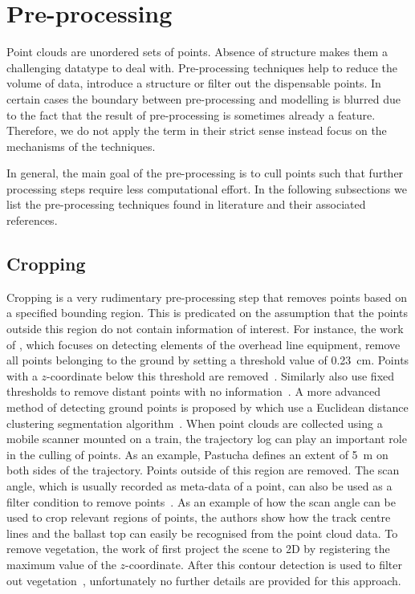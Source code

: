 \section{Pre-processing}\label{sec:stoa:preprocessing}
Point clouds are unordered sets of points. Absence of structure makes them a challenging datatype to deal with. Pre-processing techniques help to reduce the volume of data, introduce a structure or filter out the dispensable points. In certain cases the boundary between pre-processing and modelling is blurred due to the fact that the result of pre-processing is sometimes already a feature. Therefore, we do not apply the term in their strict sense instead focus on the mechanisms of the techniques. 

In general, the main goal of the pre-processing is to cull points such that further processing steps require less computational effort. In the following subsections we list the pre-processing techniques found in literature and their associated references.

\subsection{Cropping}
Cropping is a very rudimentary pre-processing step that removes points based on a specified bounding region. This is predicated on the assumption that the points outside this region do not contain information of interest. For instance, the work of \citeauthor{ariyachandra2020digital}, which focuses on detecting elements of the overhead line equipment, remove all points belonging to the ground by setting a threshold value of 0.23~cm. Points with a $z$-coordinate below this threshold are removed~\cite{ariyachandra2020digital}. Similarly \citeauthor{chen2020deep} also use fixed thresholds to remove distant points with no information~\cite{chen2020deep}. A more advanced method of detecting ground points is proposed by \citeauthor{chen2021railway} which use a Euclidean distance clustering segmentation algorithm~\cite{chen2021railway}. When point clouds are collected using a mobile scanner mounted on a train, the trajectory log can play an important role in the culling of points. As an example, Pastucha defines an extent of 5~m on both sides of the trajectory. Points outside of this region are removed. The scan angle, which is usually recorded as meta-data of a point, can also be used as a filter condition to remove points~\cite{gazero2019automated}. As an example of how the scan angle can be used to crop relevant regions of points, the authors show how the track centre lines and the ballast top can easily be recognised from the point cloud data.
To remove vegetation, the work of \citeauthor{cserep2022effective} first project the scene to 2D by registering the maximum value of the \(z\)-coordinate. After this contour detection is used to filter out vegetation~\cite{cserep2022effective}, unfortunately no further details are provided for this approach.

